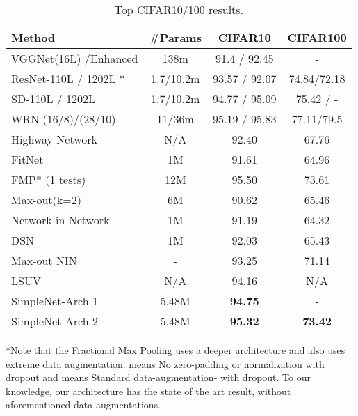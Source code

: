 \documentclass{article} \usepackage{lets_keepit_simple,times}
\begin{document}
\begin{table}[H]
\centering
\caption{Top CIFAR10/100 results.}
\label{tab:cifar}
\begin{tabular}{lccc}
\textbf{Method}  & \textbf{\#Params}   & \textbf{CIFAR10}       & \textbf{CIFAR100}      \\ \hline
VGGNet(16L) \cite{Sergey_CIFAR10_OnTorch_2015}/Enhanced  & 138m   & 91.4 / 92.45  & -             \\ ResNet-110L / 1202L \cite{He_ResNet_2015} *   & 1.7/10.2m & 93.57 / 92.07 & 74.84/72.18 \\ SD-110L / 1202L \cite{Huang_DeepNN_StochDepth_2016} & 1.7/10.2m & 94.77 / 95.09 & 75.42 / -     \\ WRN-(16/8)/(28/10) \cite{Zagoruyko_WRN_2016} & 11/36m    & 95.19 / 95.83 & 77.11/79.5  \\ Highway Network \cite{Srivastava_HighwayNets_2015}  & N/A   & 92.40  & 67.76    \\ FitNet \cite{Romero_Fitnet_2014}   & 1M  & 91.61  & 64.96   \\ FMP* (1 tests) \cite{Graham_FractionalMaxpooling_2014}     & 12M    & 95.50   & 73.61         \\ Max-out(k=2) \cite{Goodfellow_MaxoutNetwork_2013}    & 6M  & 90.62   & 65.46         \\ Network in Network \cite{Lin_NIN_2013}   & 1M   & 91.19    & 64.32   \\ DSN \cite{Lee_DeeplySupervisedNet_2015}   & 1M   & 92.03   & 65.43         \\ Max-out NIN \cite{JiaRen_BatchNormMaxoutNIN_2015}    & -     & 93.25         & 71.14         \\ LSUV \cite{Mishkin_AllYouNeedIsGoodInit_2016}    & N/A    & 94.16    & N/A     \\ SimpleNet-Arch 1       & 5.48M      & \textbf{94.75}   & -         \\ 
SimpleNet-Arch 2      & 5.48M      & \textbf{95.32}   & \textbf{73.42}         \\ \hline
\end{tabular}
\end{table}

*Note that the Fractional Max Pooling \cite{Graham_FractionalMaxpooling_2014} uses a deeper architecture and also uses extreme data augmentation.   means No zero-padding or normalization with dropout and  means Standard data-augmentation- with dropout. To our knowledge, our architecture has the state of the art result, without aforementioned data-augmentations.
\end{document}
